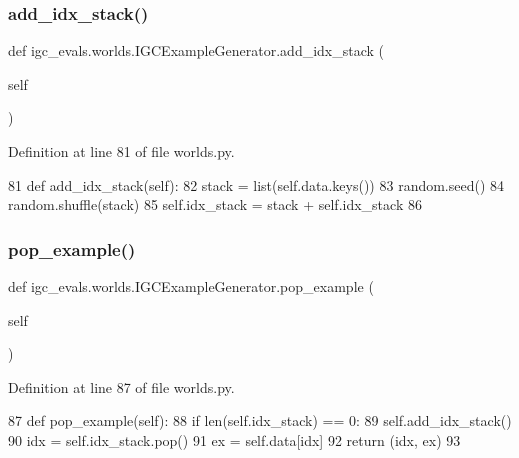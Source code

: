 \subsubsection{\texorpdfstring{add\+\_\+idx\+\_\+stack()}{add\_idx\_stack()}}
{\footnotesize\ttfamily def igc\+\_\+evals.\+worlds.\+I\+G\+C\+Example\+Generator.\+add\+\_\+idx\+\_\+stack (\begin{DoxyParamCaption}\item[{}]{self }\end{DoxyParamCaption})}



Definition at line 81 of file worlds.\+py.


\begin{DoxyCode}
81     \textcolor{keyword}{def }add\_idx\_stack(self):
82         stack = list(self.data.keys())
83         random.seed()
84         random.shuffle(stack)
85         self.idx\_stack = stack + self.idx\_stack
86 
\end{DoxyCode}
\mbox{\label{classigc__evals_1_1worlds_1_1IGCExampleGenerator_a68420b6b80ae5d3a8825302359371ed5}} 
\subsubsection{\texorpdfstring{pop\+\_\+example()}{pop\_example()}}
{\footnotesize\ttfamily def igc\+\_\+evals.\+worlds.\+I\+G\+C\+Example\+Generator.\+pop\+\_\+example (\begin{DoxyParamCaption}\item[{}]{self }\end{DoxyParamCaption})}



Definition at line 87 of file worlds.\+py.


\begin{DoxyCode}
87     \textcolor{keyword}{def }pop\_example(self):
88         \textcolor{keywordflow}{if} len(self.idx\_stack) == 0:
89             self.add\_idx\_stack()
90         idx = self.idx\_stack.pop()
91         ex = self.data[idx]
92         \textcolor{keywordflow}{return} (idx, ex)
93 
\end{DoxyCode}
\mbox{\label{classigc__evals_1_1worlds_1_1IGCExampleGenerator_a34dc6ef46a9ba8a1c72c8b674ff444b9}} 
